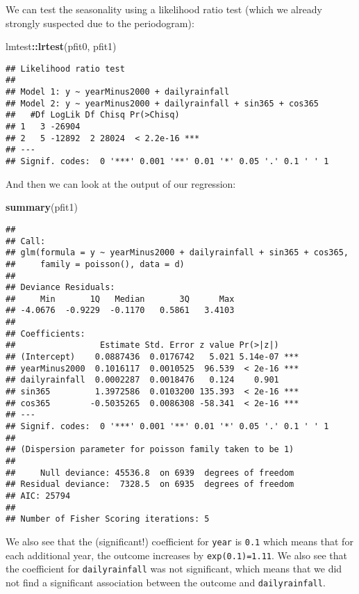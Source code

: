 \documentclass[]{book}
\newenvironment{Shaded}{\begin{snugshade}}{\end{snugshade}}
\newcommand{\KeywordTok}[1]{\textcolor[rgb]{0.13,0.29,0.53}{\textbf{#1}}}
\newcommand{\OperatorTok}[1]{\textcolor[rgb]{0.81,0.36,0.00}{\textbf{#1}}}
\newcommand{\NormalTok}[1]{#1}
\begin{document}
We can test the seasonality using a likelihood ratio test (which we
already strongly suspected due to the periodogram):

\begin{Shaded}
\begin{Highlighting}[]
\NormalTok{lmtest}\OperatorTok{::}\KeywordTok{lrtest}\NormalTok{(pfit0, pfit1)}
\end{Highlighting}
\end{Shaded}

\begin{verbatim}
## Likelihood ratio test
## 
## Model 1: y ~ yearMinus2000 + dailyrainfall
## Model 2: y ~ yearMinus2000 + dailyrainfall + sin365 + cos365
##   #Df LogLik Df Chisq Pr(>Chisq)    
## 1   3 -26904                        
## 2   5 -12892  2 28024  < 2.2e-16 ***
## ---
## Signif. codes:  0 '***' 0.001 '**' 0.01 '*' 0.05 '.' 0.1 ' ' 1
\end{verbatim}

And then we can look at the output of our regression:

\begin{Shaded}
\begin{Highlighting}[]
\KeywordTok{summary}\NormalTok{(pfit1)}
\end{Highlighting}
\end{Shaded}

\begin{verbatim}
## 
## Call:
## glm(formula = y ~ yearMinus2000 + dailyrainfall + sin365 + cos365, 
##     family = poisson(), data = d)
## 
## Deviance Residuals: 
##     Min       1Q   Median       3Q      Max  
## -4.0676  -0.9229  -0.1170   0.5861   3.4103  
## 
## Coefficients:
##                 Estimate Std. Error z value Pr(>|z|)    
## (Intercept)    0.0887436  0.0176742   5.021 5.14e-07 ***
## yearMinus2000  0.1016117  0.0010525  96.539  < 2e-16 ***
## dailyrainfall  0.0002287  0.0018476   0.124    0.901    
## sin365         1.3972586  0.0103200 135.393  < 2e-16 ***
## cos365        -0.5035265  0.0086308 -58.341  < 2e-16 ***
## ---
## Signif. codes:  0 '***' 0.001 '**' 0.01 '*' 0.05 '.' 0.1 ' ' 1
## 
## (Dispersion parameter for poisson family taken to be 1)
## 
##     Null deviance: 45536.8  on 6939  degrees of freedom
## Residual deviance:  7328.5  on 6935  degrees of freedom
## AIC: 25794
## 
## Number of Fisher Scoring iterations: 5
\end{verbatim}

We also see that the (significant!) coefficient for \texttt{year} is
\texttt{0.1} which means that for each additional year, the outcome
increases by \texttt{exp(0.1)=1.11}. We also see that the coefficient
for \texttt{dailyrainfall} was not significant, which means that we did
not find a significant association between the outcome and
\texttt{dailyrainfall}.
\end{document}
